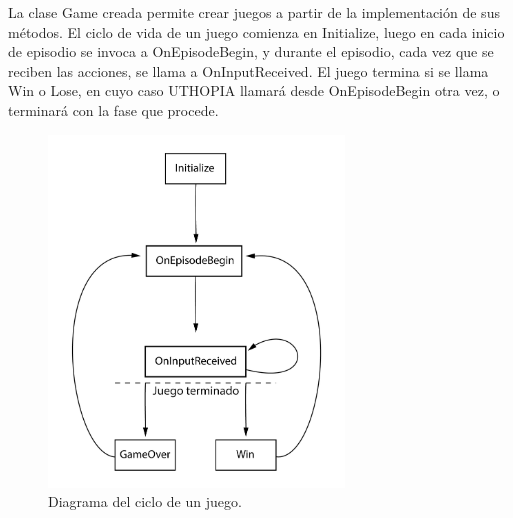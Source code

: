 La clase Game creada permite crear juegos a partir de la implementación de sus métodos. El ciclo de vida de un juego comienza en Initialize, luego en cada inicio de episodio se invoca a OnEpisodeBegin, y durante el episodio, cada vez que se reciben las acciones, se llama a OnInputReceived. El juego termina si se llama Win o Lose, en cuyo caso UTHOPIA llamará desde OnEpisodeBegin otra vez, o terminará con la fase que procede.
 
\begin{figure}[ht!]
    \centering
    \includegraphics[width=0.7\textwidth]{Graphics/uthopia_game_flow.png}
    \caption{Diagrama del ciclo de un juego.}
    \label{fig:cicle-of-games}
\end{figure}
 
\vspace*{1cm}
 
